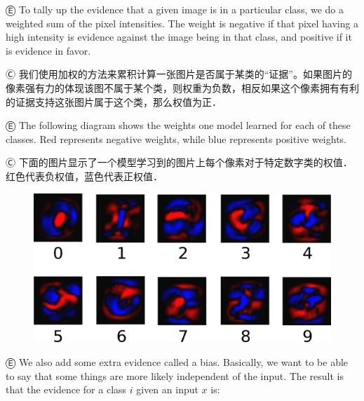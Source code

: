 Ⓔ To tally up the evidence that a given image is in a particular class, we do a weighted sum of the pixel intensities. The weight is negative if that pixel having a high intensity is evidence against the image being in that class, and positive if it is evidence in favor.

Ⓒ 我们使用加权的方法来累积计算一张图片是否属于某类的“证据”。如果图片的像素强有力的体现该图不属于某个类，则权重为负数，相反如果这个像素拥有有利的证据支持这张图片属于这个类，那么权值为正．

Ⓔ The following diagram shows the weights one model learned for each of these classes. Red represents negative weights, while blue represents positive weights.

Ⓒ 下面的图片显示了一个模型学习到的图片上每个像素对于特定数字类的权值．红色代表负权值，蓝色代表正权值．

\begin{figure}[htbp]
\centering
\includegraphics[width=.65\textwidth]{../SOURCE/images/softmax-weights.png}
\caption{}
\end{figure}

Ⓔ We also add some extra evidence called a bias. Basically, we want to be able to say that some things are more likely independent of the input. The result is that the evidence for a class $i$ given an input $x$ is:

